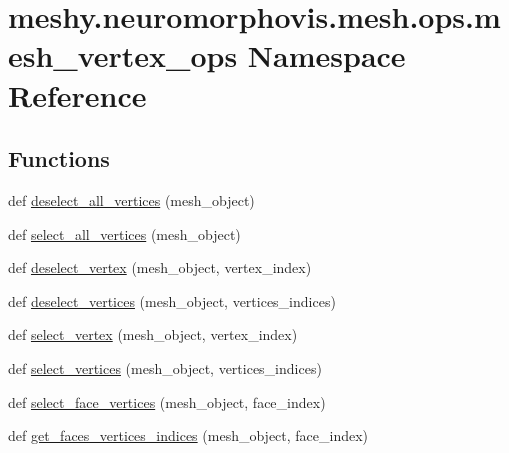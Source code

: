 \hypertarget{namespacemeshy_1_1neuromorphovis_1_1mesh_1_1ops_1_1mesh__vertex__ops}{}\section{meshy.\+neuromorphovis.\+mesh.\+ops.\+mesh\+\_\+vertex\+\_\+ops Namespace Reference}
\label{namespacemeshy_1_1neuromorphovis_1_1mesh_1_1ops_1_1mesh__vertex__ops}
\subsection*{Functions}
\begin{DoxyCompactItemize}
\item 
def \hyperlink{namespacemeshy_1_1neuromorphovis_1_1mesh_1_1ops_1_1mesh__vertex__ops_ab54997ebb77626ac7957e5398788c1d1}{deselect\+\_\+all\+\_\+vertices} (mesh\+\_\+object)
\item 
def \hyperlink{namespacemeshy_1_1neuromorphovis_1_1mesh_1_1ops_1_1mesh__vertex__ops_a3704da1b37d62483c61c71c70d5bbb34}{select\+\_\+all\+\_\+vertices} (mesh\+\_\+object)
\item 
def \hyperlink{namespacemeshy_1_1neuromorphovis_1_1mesh_1_1ops_1_1mesh__vertex__ops_a25771cb937a486436b0089a6aedbfafe}{deselect\+\_\+vertex} (mesh\+\_\+object, vertex\+\_\+index)
\item 
def \hyperlink{namespacemeshy_1_1neuromorphovis_1_1mesh_1_1ops_1_1mesh__vertex__ops_ae327b773959624d653f1192a37bbefd3}{deselect\+\_\+vertices} (mesh\+\_\+object, vertices\+\_\+indices)
\item 
def \hyperlink{namespacemeshy_1_1neuromorphovis_1_1mesh_1_1ops_1_1mesh__vertex__ops_aea5083c2ca2c0369ad5b5b06c53e3b71}{select\+\_\+vertex} (mesh\+\_\+object, vertex\+\_\+index)
\item 
def \hyperlink{namespacemeshy_1_1neuromorphovis_1_1mesh_1_1ops_1_1mesh__vertex__ops_ad7bdcf8f4ea835617bb721c6f3132950}{select\+\_\+vertices} (mesh\+\_\+object, vertices\+\_\+indices)
\item 
def \hyperlink{namespacemeshy_1_1neuromorphovis_1_1mesh_1_1ops_1_1mesh__vertex__ops_aed3d28f40900189a4bdb1282579115e2}{select\+\_\+face\+\_\+vertices} (mesh\+\_\+object, face\+\_\+index)
\item 
def \hyperlink{namespacemeshy_1_1neuromorphovis_1_1mesh_1_1ops_1_1mesh__vertex__ops_a65f97aac63975a8c3c21cfa4cdaca704}{get\+\_\+faces\+\_\+vertices\+\_\+indices} (mesh\+\_\+object, face\+\_\+index)

\end{DoxyCompactItemize}
